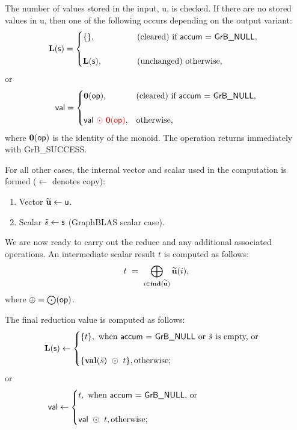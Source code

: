 The number of values stored in the input, {\sf u}, is checked.  If there are no stored values in {\sf u}, then one of the following occurs depending on the output variant:
\[ 
{\sf {\bf L}(s)} =
\begin{cases}
    \{\}, & \mbox{(cleared) if {\sf accum} = {\sf GrB\_NULL}}, ~~\\ & \\
    {\sf {\bf L}(s)}, ~~~ ~~~~~~~ & \mbox{(unchanged) otherwise,}
\end{cases}
\]
or
\[ 
{\sf val} =
\begin{cases}
    \bold{0}({\sf op}), & \mbox{(cleared) if {\sf accum} = {\sf GrB\_NULL}}, \\ & \\
    {\sf val}{\color{red} ~\odot~ {\bf 0}({\sf op})}, & \mbox{otherwise,}
\end{cases}
\]
where $\bold{0}({\sf op})$ is the identity of the monoid. The operation returns immediately with {\sf GrB\_SUCCESS}.

For all other cases, the internal vector and scalar used in 
the computation is formed ($\leftarrow$ denotes copy):
\begin{enumerate}
	\item Vector ${\bf \widetilde{u}} \leftarrow {\sf u}$.
    \item Scalar ${\tilde{s}} \leftarrow {\sf s}$ (GraphBLAS scalar case).
\end{enumerate}

We are now ready to carry out the reduce and any additional associated operations.  
An intermediate scalar result $t$ is computed as follows:
\[ 
t ~ = ~
    \bigoplus\limits_{i \in \bold{ind}({\bf \widetilde{u}})} {\bf \widetilde{u}}(i),
\]
where $\oplus = \bigodot({\sf op})$.

The final reduction value is computed as follows:
\[
{\sf {\bf L}(s)} \leftarrow
    \begin{cases}
    \{ t \}, \text{ when {\sf accum = GrB\_NULL} or ${\tilde{s}}$ is empty, or} \\ & \\
    \{ {\bf val}({\tilde{s}}) ~\odot ~ t \}, \text{otherwise;} \\
    \end{cases}
\]
or 
\[
{\sf val} \leftarrow
    \begin{cases}
    t, \text{ when {\sf accum = GrB\_NULL}, or} \hspace*{0.95in} \\ & \\
    {\sf val} ~\odot ~t, \text{otherwise;} \\
    \end{cases}
\]

